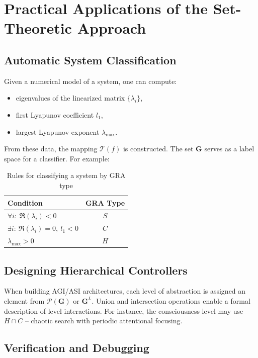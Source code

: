 \documentclass[12pt,a4paper]{article}
\newcommand{\G}{\mathbf{G}}
\newcommand{\T}{\mathcal{T}}
\newcommand{\Pset}{\mathcal{P}}
\begin{document}
\section{Practical Applications of the Set-Theoretic Approach}
\label{sec:applications}

\subsection{Automatic System Classification}

Given a numerical model of a system, one can compute:
\begin{itemize}
    \item eigenvalues of the linearized matrix $\{\lambda_i\}$,
    \item first Lyapunov coefficient $l_1$,
    \item largest Lyapunov exponent $\lambda_{\max}$.
\end{itemize}

From these data, the mapping $\T(f)$ is constructed. The set $\G$ serves as a label space for a classifier. For example:

\begin{table}[h!]
\centering
\caption{Rules for classifying a system by GRA type}
\label{tab:classification}
\begin{tabular}{@{}lc@{}}
\toprule
Condition & GRA Type \\
\midrule
$\forall i:\ \Re(\lambda_i) < 0$ & $S$ \\
$\exists i:\ \Re(\lambda_i) = 0,\ l_1 < 0$ & $C$ \\
$\lambda_{\max} > 0$ & $H$ \\
\bottomrule
\end{tabular}
\end{table}

\subsection{Designing Hierarchical Controllers}

When building AGI/ASI architectures, each level of abstraction is assigned an element from $\Pset(\G)$ or $\G^L$. Union and intersection operations enable a formal description of level interactions. For instance, the consciousness level may use $H \cap C$ – chaotic search with periodic attentional focusing.

\subsection{Verification and Debugging}
\end{document}
